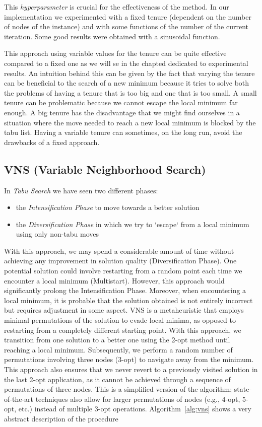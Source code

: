 \documentclass{article}
\begin{document}
This \textit{hyperparameter} is crucial for the effectiveness of the method. In our implementation we experimented with a fixed tenure (dependent on the number of
nodes of the instance) and with some functions of the number of the current iteration. Some good results were obtained with a sinusoidal function.

This approach using variable values for the tenure can be quite effective compared to a fixed one as we will se in the chapted dedicated to experimental results.
An intuition behind this can be given by the fact that varying the tenure can be beneficial to the search of a new minimum because it tries to solve both the problems of having a tenure that is too big and one that is too small.
A small tenure can be problematic because we cannot escape the local minimum far enough. A big tenure has the disadvantage that we might find ourselves in a situation where the move needed to reach a new local minimum is blocked by the
tabu list. Having a variable tenure can sometimes, on the long run, avoid the drawbacks of a fixed approach.

\subsection{VNS (Variable Neighborhood Search)}
In \textit{Tabu Search} we have seen two different phases: 
\begin{itemize}
	\item the \textit{Intensification Phase} to move towards a better solution
	\item the \textit{Diversification Phase} in which we try to `escape` from a local minimum using only
	non-tabu moves
\end{itemize}
With this approach, we may spend a considerable amount of time without achieving any improvement in 
solution quality (Diversification Phase). One potential solution could involve restarting from a random 
point each time we encounter a local minimum (Multistart). However, this approach would significantly 
prolong the Intensification Phase. Moreover, when encountering a local minimum, it is probable 
that the solution obtained is not entirely incorrect but requires adjustment in some aspect.
VNS is a metaheuristic that employs minimal permutations of the solution to evade local minima, as 
opposed to restarting from a completely different starting point.
With this approach, we transition from one solution to a better one using the 2-opt method until reaching 
a local minimum. Subsequently, we perform a random number of permutations involving three nodes (3-opt)
to navigate away from the minimum. This approach also ensures that we never revert to a previously visited
solution in the last 2-opt application, as it cannot be achieved through a sequence of permutations of
three nodes.
This is a simplified version of the algorithm; state-of-the-art techniques also allow for larger permutations
of nodes (e.g., 4-opt, 5-opt, etc.) instead of multiple 3-opt operations.
Algorithm~\ref{alg:vns} shows a very abstract description of the procedure
\end{document}
